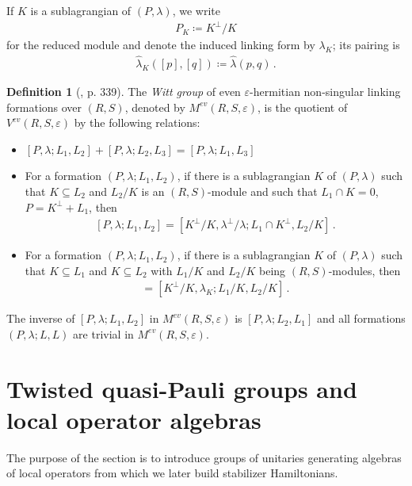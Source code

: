 \documentclass[sn-mathphys-num]{sn-jnl}
\theoremstyle{definition}
\newtheorem{definition}[lemma]{Definition}
\numberwithin{equation}{section}
\theoremstyle{definition}
\def\ep{\varepsilon}
\def\l{{\lambda}}
\def\hl{{\hat \lambda}}
\begin{document}
If $K$ is a sublagrangian of $(P,\l)$, we write
\begin{align}\label{eq:sublagrangian_reduction_form}
    P_K\coloneqq K^{\perp}/K
\end{align}
for the reduced module and denote the induced linking form by $\l_K$; its pairing is
\begin{align}
    \hl_K([p],[q])\coloneqq\hl(p,q)\,.
\end{align}

\begin{definition}[\cite{Ranicki1981ExactSI}, p. 339]\label{def:witt_linking_formations}
    The \textit{Witt group} of even $\ep$-hermitian non-singular linking formations over $(R,S)$, denoted by $M^{ev}(R,S,\ep)$, is the quotient of $V^{ev}(R,S,\ep)$ by the following relations:
    \begin{itemize}
        \item $[ P,\l;L_1,L_2 ]+ [ P,\l;L_2,L_3 ]=[ P,\l;L_1,L_3 ]$
        \item For a formation $(P,\l;L_1,L_2)$, if there is a sublagrangian $K$ of $(P,\l)$ such that $K\subseteq L_2$ and $L_2/K$ is an $(R,S)$-module and such that $L_1\cap K=0 $, $P=K^{\perp}+L_1$, then 
\begin{align}\label{eq:stable_eq_of_formations}
    [P,\l;L_1,L_2]=[K^{\perp}/K,\l^{\perp}/\l;L_1\cap K^{\perp},L_2/K]\,.
\end{align}
\item For a formation $(P,\l;L_1,L_2)$, if there is a sublagrangian $K$ of $(P,\l)$ such that $K\subseteq L_1$ and $K\subseteq L_2$ with $L_1/K$ and $L_2/K$ being $(R,S)$-modules, then 
\begin{align}
    [P,\l;L_1,L_2]=[K^{\perp}/K,\l_K;L_1/K,L_2/K]\,.
\end{align}
    \end{itemize}
\end{definition}

  
The inverse of $[ P,\l;L_1,L_2]$ in $M^{ev}(R,S,\ep)$ is $[ P,\l;L_2,L_1]$ and all formations $( P,\l;L,L)$ are trivial in $M^{ev}(R,S,\ep)$.

\section{Twisted quasi-Pauli groups and local operator algebras}\label{sec:unitary_groups}

 The purpose of the section is to introduce groups of unitaries generating algebras of local operators from which we later build stabilizer Hamiltonians. 
\end{document}
